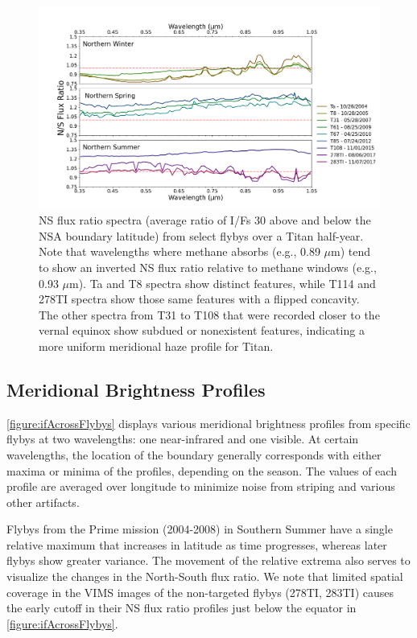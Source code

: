 \documentclass[apj,tighten]{emulateapj}
\begin{document}
\begin{figure}[tbhp]
\includegraphics[width=\textwidth]{figures/Flux.png}
\caption{\footnotesize NS flux ratio spectra (average ratio of I/Fs 30\degree{}
above and below the NSA boundary latitude) from select flybys over a Titan half-year.
Note that wavelengths where methane absorbs (e.g., 0.89 $\mu$m)
tend to show an inverted NS flux ratio relative to methane windows (e.g., 0.93 $\mu$m).
Ta and T8 spectra show distinct features, while T114 and 278TI spectra show those same features with a flipped concavity.
The other spectra from T31 to T108 that were recorded closer to the vernal equinox show subdued or nonexistent features, indicating a more uniform meridional haze profile for Titan.
\label{figure:flux}}
\end{figure}


\subsection{Meridional Brightness Profiles} 

\autoref{figure:ifAcrossFlybys} displays various meridional brightness profiles from specific flybys at two wavelengths: one near-infrared and one visible.
At certain wavelengths, the location of the boundary generally corresponds with either maxima or minima of the profiles, depending on the season.
The values of each profile are averaged over longitude to minimize noise from striping and various other artifacts.

Flybys from the Prime mission (2004-2008) in Southern Summer have a single relative maximum that increases in latitude as time progresses, whereas later flybys show greater variance.
The movement of the relative extrema also serves to visualize the changes in the North-South flux ratio.
We note that limited spatial coverage in the VIMS images of the non-targeted flybys (278TI, 283TI) causes the early cutoff in their NS flux ratio profiles just below the equator in \autoref{figure:ifAcrossFlybys}. 
\end{document}
